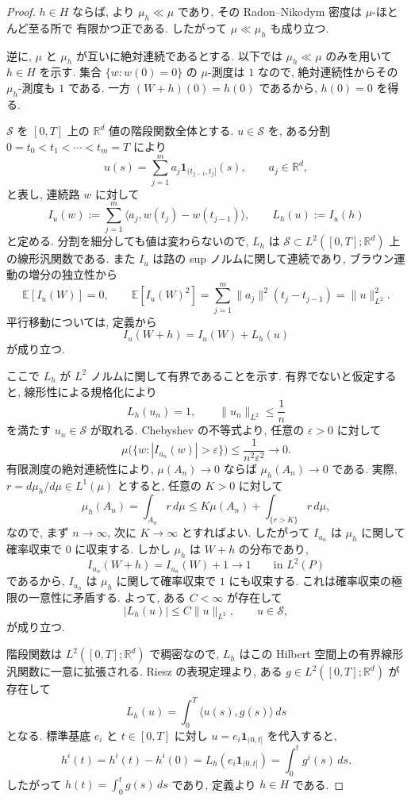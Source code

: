 \documentclass[11pt]{article}
\theoremstyle{breakstyle}
\newcommand{\E}{\mathbb{E}}
\newcommand{\ind}[1]{\mathbf{1}_{#1}}
\begin{document}
\begin{proof}
    $h\in H$ ならば,  より
    $\mu_h\ll\mu$ であり, その Radon--Nikodym 密度は $\mu$-ほとんど至る所で
    有限かつ正である. したがって $\mu\ll\mu_h$ も成り立つ.

    逆に, $\mu$ と $\mu_h$ が互いに絶対連続であるとする.
    以下では $\mu_h\ll\mu$ のみを用いて $h\in H$ を示す.
    集合 $\{w:w(0)=0\}$ の $\mu$-測度は $1$ なので,
    絶対連続性からその $\mu_h$-測度も $1$ である.
    一方 $(W+h)(0)=h(0)$ であるから, $h(0)=0$ を得る.

    $\mathcal{S}$ を $[0,T]$ 上の $\mathbb{R}^d$ 値の階段関数全体とする.
    $u\in\mathcal{S}$ を, ある分割 $0=t_0<t_1<\cdots<t_m=T$ により
    \[
        u(s)=\sum_{j=1}^m a_j\ind{(t_{j-1},t_j]}(s),
        \qquad a_j\in\mathbb{R}^d,
    \]
    と表し, 連続路 $w$ に対して
    \[
        I_u(w):=\sum_{j=1}^m
        \langle a_j,w(t_j)-w(t_{j-1})\rangle,
        \qquad L_h(u):=I_u(h)
    \]
    と定める. 分割を細分しても値は変わらないので, $L_h$ は
    $\mathcal{S}\subset L^2([0,T];\mathbb{R}^d)$ 上の線形汎関数である.
    また $I_u$ は路の sup ノルムに関して連続であり,
    ブラウン運動の増分の独立性から
    \[
        \E[I_u(W)]=0,\qquad
        \E[I_u(W)^2]=\sum_{j=1}^m\|a_j\|^2(t_j-t_{j-1})
        =\|u\|_{L^2}^2.
    \]
    平行移動については, 定義から
    \[
        I_u(W+h)=I_u(W)+L_h(u)
    \]
    が成り立つ.

    ここで $L_h$ が $L^2$ ノルムに関して有界であることを示す.
    有界でないと仮定すると, 線形性による規格化により
    \[
        L_h(u_n)=1,\qquad \|u_n\|_{L^2}\leq\frac1n
    \]
    を満たす $u_n\in\mathcal{S}$ が取れる.
    Chebyshev の不等式より, 任意の $\varepsilon>0$ に対して
    \[
        \mu\bigl(\{w:|I_{u_n}(w)|>\varepsilon\}\bigr)
        \leq\frac{1}{n^2\varepsilon^2}\longrightarrow0.
    \]
    有限測度の絶対連続性により, $\mu(A_n)\to0$ ならば
    $\mu_h(A_n)\to0$ である. 実際, $r=d\mu_h/d\mu\in L^1(\mu)$ とすると,
    任意の $K>0$ に対して
    \[
        \mu_h(A_n)=\int_{A_n}r\,d\mu
        \leq K\mu(A_n)+\int_{\{r>K\}}r\,d\mu,
    \]
    なので, まず $n\to\infty$, 次に $K\to\infty$ とすればよい.
    したがって $I_{u_n}$ は $\mu_h$ に関して確率収束で $0$ に収束する.
    しかし $\mu_h$ は $W+h$ の分布であり,
    \[
        I_{u_n}(W+h)=I_{u_n}(W)+1
        \longrightarrow1\qquad\text{in }L^2(P)
    \]
    であるから, $I_{u_n}$ は $\mu_h$ に関して確率収束で $1$ にも収束する.
    これは確率収束の極限の一意性に矛盾する.
    よって, ある $C<\infty$ が存在して
    \[
        |L_h(u)|\leq C\|u\|_{L^2},\qquad u\in\mathcal{S},
    \]
    が成り立つ.

    階段関数は $L^2([0,T];\mathbb{R}^d)$ で稠密なので,
    $L_h$ はこの Hilbert 空間上の有界線形汎関数に一意に拡張される.
    Riesz の表現定理より, ある $g\in L^2([0,T];\mathbb{R}^d)$ が存在して
    \[
        L_h(u)=\int_0^T\langle u(s),g(s)\rangle\,ds
    \]
    となる. 標準基底 $e_i$ と $t\in[0,T]$ に対し
    $u=e_i\ind{(0,t]}$ を代入すると,
    \[
        h^i(t)=h^i(t)-h^i(0)
        =L_h(e_i\ind{(0,t]})=\int_0^t g^i(s)\,ds.
    \]
    したがって $h(t)=\int_0^t g(s)\,ds$ であり, 定義より $h\in H$ である.
\end{proof}
\end{document}
